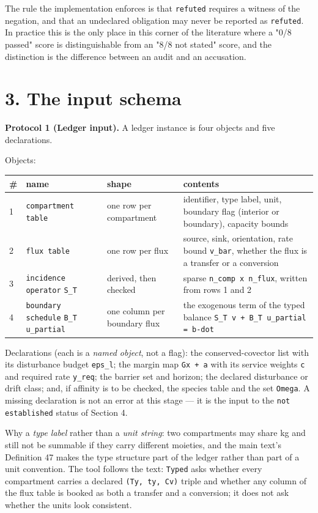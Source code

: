 \documentclass[11pt]{article}
\begin{document}
The rule the implementation enforces is that \texttt{refuted} requires a witness of the negation, and that an undeclared obligation may never be reported as \texttt{refuted}. In practice this is the only place in this corner of the literature where a "0/8 passed" score is distinguishable from an "8/8 not stated" score, and the distinction is the difference between an audit and an accusation.

\vspace{0.8em}

\section*{3. The input schema}\label{3-the-input-schema}

\textbf{Protocol 1 (Ledger input).} A ledger instance is four objects and five declarations.

Objects:

\begin{longtable}{@{}l|l|l|p{50mm}@{}}
\toprule
\# & name & shape & contents \\
\midrule
1 & \texttt{compartment table} & one row per compartment & identifier, type label, unit, boundary flag (interior or boundary), capacity bounds \\
2 & \texttt{flux table} & one row per flux & source, sink, orientation, rate bound \texttt{v\_bar}, whether the flux is a transfer or a conversion \\
3 & \texttt{incidence operator} \texttt{S\_T} & derived, then checked & sparse \texttt{n\_comp x n\_flux}, written from rows 1 and 2 \\
4 & \texttt{boundary schedule} \texttt{B\_T u\_partial} & one column per boundary flux & the exogenous term of the typed balance \texttt{S\_T v + B\_T u\_partial = b-dot} \\
\bottomrule
\end{longtable}

Declarations (each is a \emph{named object}, not a flag): the conserved-covector list with its disturbance budget \texttt{eps\_l}; the margin map \texttt{Gx + a} with its service weights \texttt{c} and required rate \texttt{y\_req}; the barrier set and horizon; the declared disturbance or drift class; and, if affinity is to be checked, the species table and the set \texttt{Omega}. A missing declaration is not an error at this stage --- it is the input to the \texttt{not established} status of Section 4.

Why a \emph{type label} rather than a \emph{unit string}: two compartments may share kg and still not be summable if they carry different moieties, and the main text's Definition 47 makes the type structure part of the ledger rather than part of a unit convention. The tool follows the text: \texttt{Typed} asks whether every compartment carries a declared \texttt{(Ty, ty, Cv)} triple and whether any column of the flux table is booked as both a transfer and a conversion; it does not ask whether the units look consistent.
\end{document}
